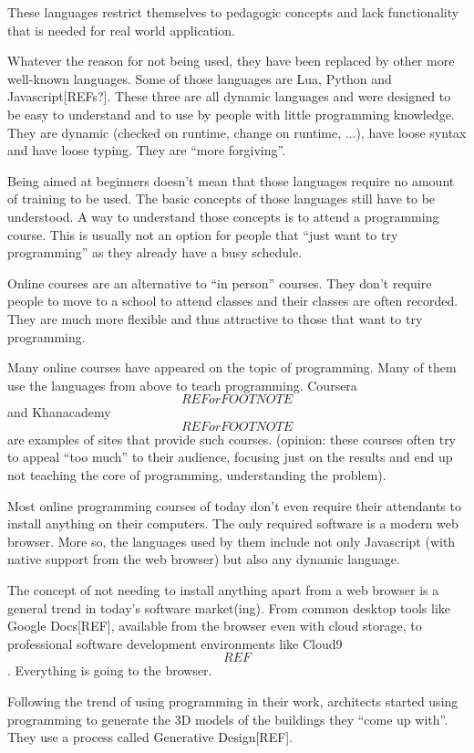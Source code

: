 \documentclass{./llncs2e/llncs}
\begin{document}
These languages restrict themselves to pedagogic concepts and lack functionality that is needed for real world application.

Whatever the reason for not being used, they have been replaced by other more well-known languages. Some of those languages are Lua, Python and Javascript[REFs?]. These three are all dynamic languages and were designed to be easy to understand and to use by people with little programming knowledge. They are dynamic (checked on runtime, change on runtime, ...), have loose syntax and have loose typing. They are ``more forgiving''.

Being aimed at beginners doesn't mean that those languages require no amount of training to be used. The basic concepts of those languages still have to be understood. A way to understand those concepts is to attend a programming course. This is usually not an option for people that ``just want to try programming'' as they already have a busy schedule.

Online courses are an alternative to ``in person'' courses. They don't require people to move to a school to attend classes and their classes are often recorded. They are much more flexible and thus attractive to those that want to try programming.

Many online courses have appeared on the topic of programming. Many of them use the languages from above to teach programming. Coursera\[REF or FOOTNOTE\] and Khanacademy\[REF or FOOTNOTE\] are examples of sites that provide such courses. (opinion: these courses often try to appeal ``too much'' to their audience, focusing just on the results and end up not teaching the core of programming, understanding the problem).

Most online programming courses of today don't even require their attendants to install anything on their computers. The only required software is a modern web browser. More so, the languages used by them include not only Javascript (with native support from the web browser) but also any dynamic language.

The concept of not needing to install anything apart from a web browser is a general trend in today's software market(ing). From common desktop tools like Google Docs[REF], available from the browser even with cloud storage, to professional software development environments like Cloud9\[REF\]. Everything is going to the browser.

Following the trend of using programming in their work, architects started using programming to generate the 3D models of the buildings they ``come up with''. They use a process called Generative Design[REF].
\end{document}
